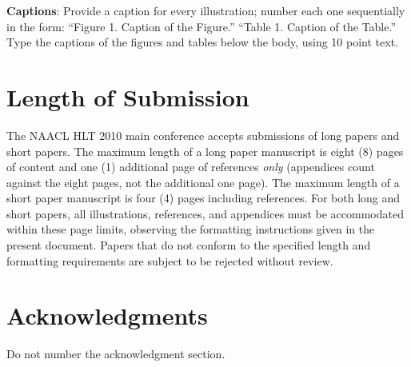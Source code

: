\documentclass[11pt,letterpaper]{article}
\begin{document}
{\bf Captions}: Provide a caption for every illustration; number each one
sequentially in the form:  ``Figure 1. Caption of the Figure.'' ``Table 1.
Caption of the Table.''  Type the captions of the figures and 
tables below the body, using 10 point text.  

\section{Length of Submission}
\label{sec:length}

The NAACL HLT 2010 main conference accepts submissions of long papers
and short papers.  The maximum length of a long paper manuscript is
eight (8) pages of content and one (1) additional page of references
\emph{only} (appendices count against the eight pages, not the
additional one page).  The maximum length of a short paper manuscript
is four (4) pages including references.  For both long and short
papers, all illustrations, references, and appendices must be
accommodated within these page limits, observing the formatting
instructions given in the present document.  Papers that do not
conform to the specified length and formatting requirements are
subject to be rejected without review.


\section*{Acknowledgments}

Do not number the acknowledgment section.
\end{document}
